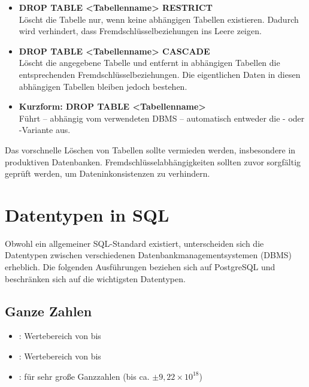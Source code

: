 \begin{itemize}
    \item \textbf{DROP TABLE <Tabellenname> RESTRICT}\\
    Löscht die Tabelle nur, wenn keine abhängigen Tabellen existieren. 
    Dadurch wird verhindert, dass Fremdschlüsselbeziehungen ins Leere zeigen.
    
    \item \textbf{DROP TABLE <Tabellenname> CASCADE}\\
    Löscht die angegebene Tabelle und entfernt in abhängigen Tabellen die entsprechenden Fremdschlüsselbeziehungen. 
    Die eigentlichen Daten in diesen abhängigen Tabellen bleiben jedoch bestehen.
    
    \item \textbf{Kurzform: DROP TABLE <Tabellenname>}\\
    Führt – abhängig vom verwendeten DBMS – automatisch entweder die - oder -Variante aus.
\end{itemize}

\begin{tcolorbox}[red, title={Hinweis}]
    Das vorschnelle Löschen von Tabellen sollte vermieden werden, insbesondere in produktiven Datenbanken. 
    Fremdschlüsselabhängigkeiten sollten zuvor sorgfältig geprüft werden, um Dateninkonsistenzen zu verhindern.
\end{tcolorbox}


\section{Datentypen in SQL}

Obwohl ein allgemeiner SQL-Standard existiert, unterscheiden sich die Datentypen zwischen verschiedenen Datenbankmanagementsystemen (DBMS) erheblich. 
Die folgenden Ausführungen beziehen sich auf PostgreSQL und beschränken sich auf die wichtigsten Datentypen.

\subsection{Ganze Zahlen}
\begin{itemize}
    \item \textbf{}: Wertebereich von  bis 
    \item \textbf{}: Wertebereich von  bis 
    \item \textbf{}: für sehr große Ganzzahlen (bis ca. $\pm 9{,}22 \times 10^{18}$)
\end{itemize}

